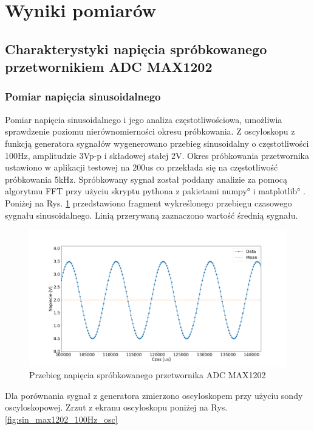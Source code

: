\section{Wyniki pomiarów}


\subsection{Charakterystyki napięcia spróbkowanego przetwornikiem ADC MAX1202}

\subsubsection{Pomiar napięcia sinusoidalnego}

Pomiar napięcia sinusoidalnego i jego analiza częstotliwościowa, umożliwia sprawdzenie poziomu nierównomierności okresu próbkowania. 
Z oscyloskopu z funkcją generatora sygnałów wygenerowano przebieg sinusoidalny o częstotliwości 100Hz, amplitudzie 3Vp-p i składowej stałej 2V. Okres próbkowania przetwornika ustawiono w aplikacji testowej na 200us co przekłada się na częstotliwość próbkowania 5kHz. 
Spróbkowany sygnał został poddany analizie za pomocą algorytmu FFT przy użyciu skryptu pythona z pakietami \ang{numpy} i  \ang{matplotlib} .
Poniżej na Rys. \ref{fig:sin_max1202_100Hz_adc} przedstawiono fragment wykreślonego przebiegu czasowego sygnału sinusoidalnego. Linią przerywaną zaznaczono wartość średnią sygnału.

\begin{figure}[H]
		\includegraphics[width=14cm]{sin_max1202_100Hz_adc}
	\caption{Przebieg napięcia spróbkowanego przetwornika ADC MAX1202} 
	\label{fig:sin_max1202_100Hz_adc}
\end{figure}

Dla porównania sygnał z generatora zmierzono oscyloskopem przy użyciu sondy oscyloskopowej. Zrzut z ekranu oscyloskopu poniżej na Rys. \ref{fig:sin_max1202_100Hz_osc} 

